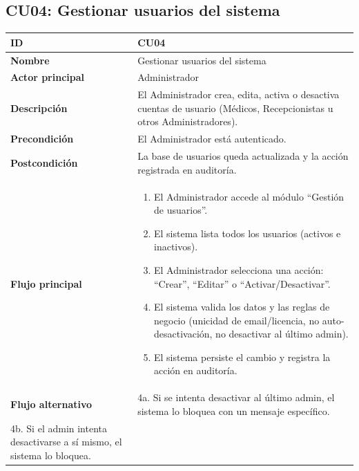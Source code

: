 \documentclass[11pt,a4paper]{article}
\begin{document}
\subsection*{CU04: Gestionar usuarios del sistema}
\begin{longtable}{|L{3.5cm}|L{10cm}|}
    \hline
    \textbf{ID}                & CU04                                                                                                                   \\ \hline
    \textbf{Nombre}            & Gestionar usuarios del sistema                                                                                         \\ \hline
    \textbf{Actor principal}   & Administrador                                                                                                          \\ \hline
    \textbf{Descripción}       & El Administrador crea, edita, activa o desactiva cuentas de usuario (Médicos, Recepcionistas u otros Administradores). \\ \hline
    \textbf{Precondición}      & El Administrador está autenticado.                                                                                     \\ \hline
    \textbf{Postcondición}     & La base de usuarios queda actualizada y la acción registrada en auditoría.                                             \\ \hline
    \textbf{Flujo principal}   &
    \begin{enumerate}
        \item El Administrador accede al módulo ``Gestión de usuarios''.
        \item El sistema lista todos los usuarios (activos e inactivos).
        \item El Administrador selecciona una acción: ``Crear'', ``Editar'' o ``Activar/Desactivar''.
        \item El sistema valida los datos y las reglas de negocio (unicidad de email/licencia, no auto-desactivación, no desactivar al último admin).
        \item El sistema persiste el cambio y registra la acción en auditoría.
    \end{enumerate}    \\ \hline
    \textbf{Flujo alternativo} &
    4a. Si se intenta desactivar al último admin, el sistema lo bloquea con un mensaje específico.                                                      \\
    4b. Si el admin intenta desactivarse a sí mismo, el sistema lo bloquea.                                                                             \\ \hline
\end{longtable}
\end{document}
